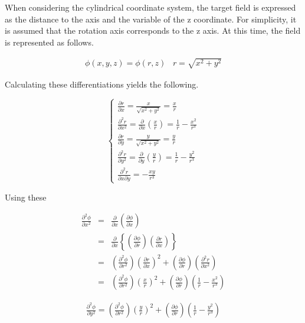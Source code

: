 When considering the cylindrical coordinate system, the target field is expressed as the distance to the axis and the variable of the z coordinate. 
%
For simplicity, it is assumed that the rotation axis corresponds to the z axis. 
%
At this time, the field is represented as follows.

\begin{eqnarray}
\phi(x,y,z) = \phi(r,z)\;\;\; r=\sqrt{x^2+y^2}
\end{eqnarray}

Calculating these differentiations yields the following.

\begin{equation}
\left\{\begin{array}{l}
\frac{\partial r}{\partial x} = \frac{x}{\sqrt{x^2+y^2}} = \frac{x}{r}  \\
\frac{\partial^2 r}{\partial x^2} = \frac{\partial}{\partial x}(\frac{x}{r}) = \frac{1}{r} - \frac{x^2}{r^3}\\
\frac{\partial r}{\partial y} = \frac{y}{\sqrt{x^2+y^2}}=\frac{y}{r} \\
 \frac{\partial^2 r}{\partial y^2} = \frac{\partial}{\partial y}(\frac{y}{r}) = \frac{1}{r} - \frac{y^2}{r^3}\\
\frac{\partial^2 r}{\partial x\partial y} = -\frac{xy}{r^3}
\end{array} \right.
\end{equation}

Using these

\begin{eqnarray}
\frac{\partial^2 \phi}{\partial x^2}
&=& \frac{\partial}{\partial x}\left(\frac{\partial\phi}{\partial x}\right) \\
&=& \frac{\partial}{\partial x}\left\{\left(\frac{\partial\phi}{\partial r}\right)\left(\frac{\partial r}{\partial x}\right)\right\}  \\
&=& \left(\frac{\partial^2\phi}{\partial r^2}\right)\left(\frac{\partial r}{\partial x}\right)^2 + \left(\frac{\partial\phi}{\partial r}\right)\left(\frac{\partial^2 r}{\partial x^2}\right)\\
&=& \left(\frac{\partial^2\phi}{\partial r^2}\right)\left(\frac{x}{r}\right)^2 + \left(\frac{\partial\phi}{\partial r}\right)\left(\frac{1}{r} - \frac{x^2}{r^3}\right)
\end{eqnarray}


\begin{eqnarray}
\frac{\partial^2 \phi}{\partial y^2} = \left(\frac{\partial^2\phi}{\partial r^2}\right)\left(\frac{y}{r}\right)^2 + \left(\frac{\partial\phi}{\partial r}\right)\left(\frac{1}{r} - \frac{y^2}{r^3}\right)
\end{eqnarray}


